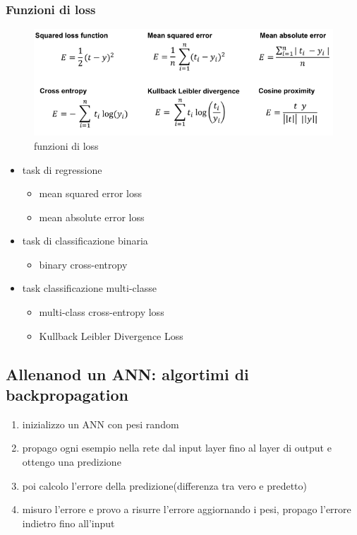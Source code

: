 \subsubsection{Funzioni di loss}
\begin{figure}[H]
    \centering
    \includegraphics[width=0.8\linewidth]{imgs/funzioni-di-loss}
    \caption{funzioni di loss}
    \label{fig:funzioni_di_loss}
\end{figure}

\begin{itemize}
    \item task di regressione
    \begin{itemize}
        \item mean squared error loss
        \item mean absolute error loss
    \end{itemize}
    \item task di classificazione binaria
    \begin{itemize}
        \item binary cross-entropy
    \end{itemize}
    \item task classificazione multi-classe
    \begin{itemize}
        \item multi-class cross-entropy loss
        \item Kullback Leibler Divergence Loss
    \end{itemize}
\end{itemize}


\subsection{Allenanod un ANN: algortimi di backpropagation}

\begin{enumerate}
    \item inizializzo un ANN con pesi random
    \item propago ogni esempio nella rete dal input layer fino al layer di
    output e ottengo una predizione
    \item poi calcolo l'errore della predizione(differenza tra vero e predetto)
    \item misuro l'errore e provo a risurre l'errore aggiornando i pesi,
    propago l'errore indietro fino all'input
\end{enumerate}

